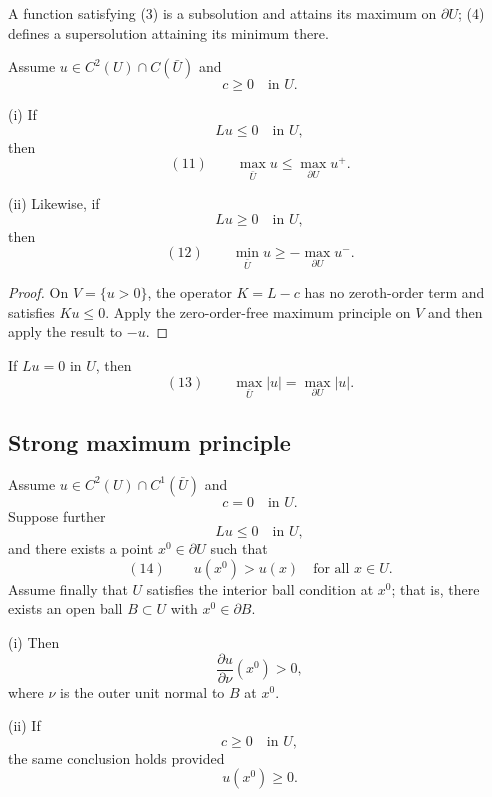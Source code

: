 \begin{remark}
\label{rem:subsolution-supersolution-terminology}

A function satisfying (3) is a subsolution and attains its maximum on $\partial U$; (4) defines a supersolution attaining its minimum there.
\end{remark}

\begin{theorem}
\label{thm:weak-maximum-principle-c-nonneg}

Assume $u \in C^2(U) \cap C(\bar U)$ and
$$c \geq 0 \quad \text{in } U.$$

(i) If
$$Lu \leq 0 \quad \text{in } U,$$
then
$$(11) \qquad \max_{\bar U} u \leq \max_{\partial U} u^+.$$

(ii) Likewise, if
$$Lu \geq 0 \quad \text{in } U,$$
then
$$(12) \qquad \min_{\bar U} u \geq -\max_{\partial U} u^-.$$
\end{theorem}

\begin{proof}
\sketch On $V=\{u>0\}$, the operator $K=L-c$ has no zeroth-order term and satisfies $Ku\le0$. Apply the zero-order-free maximum principle on $V$ and then apply the result to $-u$.
\end{proof}

\begin{remark}
\label{rem:weak-maximum-principle-absolute-value}

If $Lu=0$ in $U$, then
$$(13) \qquad \max_{\bar U}|u| = \max_{\partial U}|u|.$$
\end{remark}

\subsection{Strong maximum principle}

\begin{lemma}
\label{lem:hopfs-lemma}

Assume $u \in C^2(U) \cap C^1(\bar U)$ and
$$c = 0 \quad \text{in } U.$$
Suppose further
$$Lu \leq 0 \quad \text{in } U,$$
and there exists a point $x^0 \in \partial U$ such that
$$(14) \qquad u(x^0) > u(x) \quad \text{for all } x \in U.$$
Assume finally that $U$ satisfies the interior ball condition at $x^0$; that is, there exists an open ball $B \subset U$ with $x^0 \in \partial B$.

(i) Then
$$\frac{\partial u}{\partial\nu}(x^0) > 0,$$
where $\nu$ is the outer unit normal to $B$ at $x^0$.

(ii) If
$$c \geq 0 \quad \text{in } U,$$
the same conclusion holds provided
$$u(x^0) \geq 0.$$
\end{lemma}

